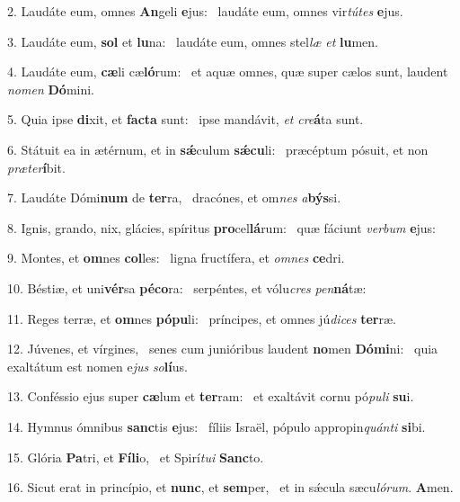 2. Laudáte eum, omnes \textbf{An}geli \textbf{e}jus: \ast\  laudáte eum, omnes vir\textit{tú}\textit{tes} \textbf{e}jus.\

3. Laudáte eum, \textbf{sol} et \textbf{lu}na: \ast\  laudáte eum, omnes stel\textit{læ} \textit{et} \textbf{lu}men.\

4. Laudáte eum, \textbf{cæ}li cæ\textbf{ló}rum: \ast\  et aquæ omnes, quæ super cælos sunt, laudent \textit{no}\textit{men} \textbf{Dó}mini.\

5. Quia ipse \textbf{di}xit, et \textbf{fac}\textbf{ta} sunt: \ast\  ipse mandávit, \textit{et} \textit{cre}\textbf{á}ta sunt.\

6. Státuit ea in ætérnum, et in \textbf{sǽ}culum \textbf{sǽ}\textbf{cu}li: \ast\  præcéptum pósuit, et non \textit{præ}\textit{ter}\textbf{í}bit.\

7. Laudáte Dómi\textbf{num} de \textbf{ter}ra, \ast\  dracónes, et om\textit{nes} \textit{a}\textbf{býs}si.\

8. Ignis, grando, nix, glácies, spíritus \textbf{pro}cel\textbf{lá}rum: \ast\  quæ fáciunt \textit{ver}\textit{bum} \textbf{e}jus:\

9. Montes, et \textbf{om}nes \textbf{col}les: \ast\  ligna fructífera, et \textit{om}\textit{nes} \textbf{ce}dri.\

10. Béstiæ, et uni\textbf{vér}sa \textbf{pé}\textbf{co}ra: \ast\  serpéntes, et vólu\textit{cres} \textit{pen}\textbf{ná}tæ:\

11. Reges terræ, et \textbf{om}nes \textbf{pó}\textbf{pu}li: \ast\  príncipes, et omnes jú\textit{di}\textit{ces} \textbf{ter}ræ.\

12. Júvenes, et vírgines, \dag\  senes cum junióribus laudent \textbf{no}men \textbf{Dó}\textbf{mi}ni: \ast\  quia exaltátum est nomen e\textit{jus} \textit{so}\textbf{lí}us.\

13. Conféssio ejus super \textbf{cæ}lum et \textbf{ter}ram: \ast\  et exaltávit cornu pó\textit{pu}\textit{li} \textbf{su}i.\

14. Hymnus ómnibus \textbf{sanc}tis \textbf{e}jus: \ast\  fíliis Israël, pópulo appropin\textit{quán}\textit{ti} \textbf{si}bi.\

15. Glória \textbf{Pa}tri, et \textbf{Fí}\textbf{li}o, \ast\  et Spirí\textit{tu}\textit{i} \textbf{Sanc}to.\

16. Sicut erat in princípio, et \textbf{nunc}, et \textbf{sem}per, \ast\  et in sǽcula sæcu\textit{ló}\textit{rum}. \textbf{A}men.\

